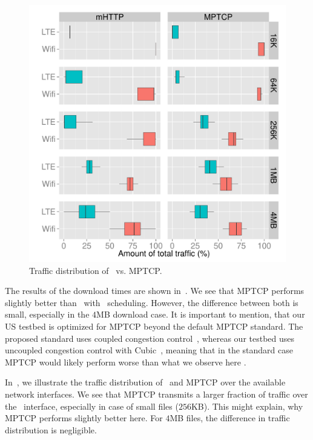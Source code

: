 \begin{figure}[!htb]
    \begin{minipage}[t]{0.8\linewidth}
    \begin{center}
        \includegraphics[width=\linewidth]{Figures/umass-mhttp-mptcp-stcp-fraction.pdf}
		\caption{\label{fig:evaluation-mptcp-traffic}Traffic distribution of \mhttp~vs. MPTCP.}
    \end{center}
    \end{minipage}
  \vspace*{-0.3cm}
\end{figure}

The results of the download times are shown in~. 
We see that MPTCP performs slightly better than \mhttp~with \algslice~scheduling. 
However, the difference between both is small, especially in the $4$MB download case. 
It is important to mention, that our US testbed is optimized for MPTCP beyond the default MPTCP standard. 
The proposed standard uses coupled congestion control~\cite{RFC-6356}, whereas our testbed uses uncoupled congestion control with Cubic~\cite{TCP-CUBIC}, meaning that in the standard case MPTCP would likely perform worse than what we observe here \cite{CHEN13-MSM}. 

In~, we illustrate the traffic distribution of \mhttp~and MPTCP over the available network interfaces. 
We see that MPTCP transmits a larger fraction of traffic over the \lte~interface, especially in case of small files (\eg $256$KB). 
This might explain, why MPTCP performs slightly better here. 
For $4$MB files, the difference in traffic distribution is negligible. 

\pagebreak
